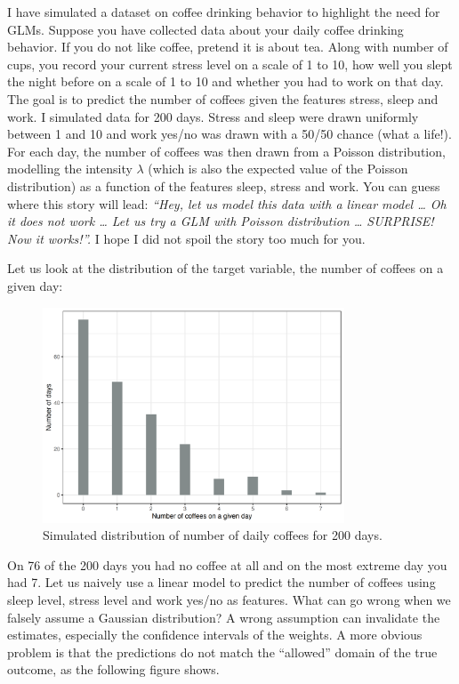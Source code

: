 \documentclass[
  11pt,
]{scrbook}
\begin{document}
I have simulated a dataset on coffee drinking behavior to highlight the need for GLMs.
Suppose you have collected data about your daily coffee drinking behavior.
If you do not like coffee, pretend it is about tea.
Along with number of cups, you record your current stress level on a scale of 1 to 10, how well you slept the night before on a scale of 1 to 10 and whether you had to work on that day.
The goal is to predict the number of coffees given the features stress, sleep and work.
I simulated data for 200 days.
Stress and sleep were drawn uniformly between 1 and 10 and work yes/no was drawn with a 50/50 chance (what a life!).
For each day, the number of coffees was then drawn from a Poisson distribution, modelling the intensity \(\lambda\) (which is also the expected value of the Poisson distribution) as a function of the features sleep, stress and work.
You can guess where this story will lead:
\emph{``Hey, let us model this data with a linear model \ldots{} Oh it does not work \ldots{} Let us try a GLM with Poisson distribution \ldots{} SURPRISE! Now it works!''.}
I hope I did not spoil the story too much for you.

Let us look at the distribution of the target variable, the number of coffees on a given day:

\begin{figure}

{\centering \includegraphics[width=0.8\textwidth]{images/poisson-data-1} 

}

\caption{Simulated distribution of number of daily coffees for 200 days.}\label{fig:poisson-data}
\end{figure}

On 76 of the 200 days you had no coffee at all and on the most extreme day you had 7.
Let us naively use a linear model to predict the number of coffees using sleep level, stress level and work yes/no as features.
What can go wrong when we falsely assume a Gaussian distribution?
A wrong assumption can invalidate the estimates, especially the confidence intervals of the weights.
A more obvious problem is that the predictions do not match the ``allowed'' domain of the true outcome, as the following figure shows.
\end{document}
